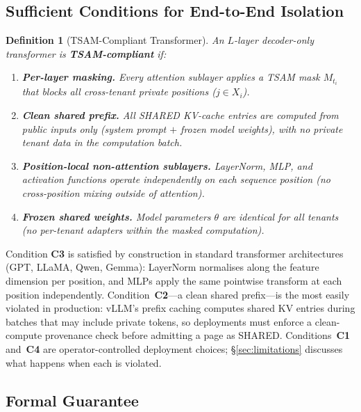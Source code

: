 \documentclass[11pt]{article}
\newtheorem{definition}{Definition}
\begin{document}
\subsection{Sufficient Conditions for End-to-End Isolation}
\label{sec:e2e:conditions}

\begin{definition}[TSAM-Compliant Transformer]
\label{def:compliant}
An $L$-layer decoder-only transformer is \textbf{TSAM-compliant} if:
\begin{enumerate}[label=\textbf{C\arabic*}.,leftmargin=2em]
    \item \textbf{Per-layer masking.}  Every attention sublayer applies a TSAM mask
          $M_{t_i}$ that blocks all cross-tenant private positions ($j \in X_i$).
    \item \textbf{Clean shared prefix.}  All SHARED KV-cache entries are computed
          from public inputs only (system prompt $+$ frozen model weights), with
          no private tenant data in the computation batch.
    \item \textbf{Position-local non-attention sublayers.}  LayerNorm, MLP, and activation
          functions operate independently on each sequence position (no cross-position
          mixing outside of attention).
    \item \textbf{Frozen shared weights.}  Model parameters $\theta$ are identical
          for all tenants (no per-tenant adapters within the masked computation).
\end{enumerate}
\end{definition}

\noindent
Condition \textbf{C3} is satisfied by construction in standard transformer
architectures (GPT, LLaMA, Qwen, Gemma): LayerNorm normalises along the
feature dimension per position, and MLPs apply the same pointwise transform
at each position independently.  Condition~\textbf{C2}---a clean shared
prefix---is the most easily violated in production: vLLM's prefix caching
computes shared KV entries during batches that may include private tokens,
so deployments must enforce a clean-compute provenance check before
admitting a page as SHARED.  Conditions~\textbf{C1} and~\textbf{C4} are
operator-controlled deployment choices; \S\ref{sec:limitations} discusses
what happens when each is violated.

\subsection{Formal Guarantee}
\label{sec:e2e:theorem}
\end{document}
